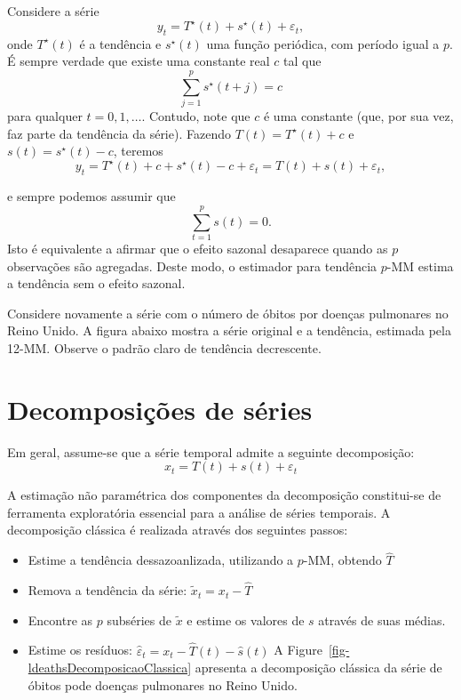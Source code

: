 \documentclass[
  letterpaper,
  DIV=11,
  numbers=noendperiod]{scrartcl}
\theoremstyle{definition}
\theoremstyle{definition}
\theoremstyle{plain}
\theoremstyle{plain}
\theoremstyle{remark}
\begin{document}
Considere a série \[y_t = T^\star(t)+s^\star(t)+\varepsilon_t,\] onde
\(T^\star(t)\) é a tendência e \(s^\star(t)\) uma função periódica, com
período igual a \(p\). É sempre verdade que existe uma constante real
\(c\) tal que \[\sum_{j=1}^p s^\star(t+j)=c\] para qualquer
\(t=0,1,\ldots\). Contudo, note que \(c\) é uma constante (que, por sua
vez, faz parte da tendência da série). Fazendo \(T(t)=T^\star(t)+c\) e
\(s(t)=s^\star(t)-c\), teremos
\[y_t = T^\star(t)+c + s^\star(t)-c+\varepsilon_t=T(t)+ s(t)+\varepsilon_t,\]

e sempre podemos assumir que \[\sum_{t=1}^{p}s(t)=0.\] Isto é
equivalente a afirmar que o efeito sazonal desaparece quando as \(p\)
observações são agregadas. Deste modo, o estimador para tendência
\(p\)-MM estima a tendência sem o efeito sazonal.

Considere novamente a série com o número de óbitos por doenças
pulmonares no Reino Unido. A figura abaixo mostra a série original e a
tendência, estimada pela 12-MM. Observe o padrão claro de tendência
decrescente.

\begin{figure}\end{figure}%

\section{Decomposições de
séries}\label{decomposiuxe7uxf5es-de-suxe9ries}

Em geral, assume-se que a série temporal admite a seguinte decomposição:
\[x_t=T(t)+s(t)+\varepsilon_t\]

A estimação não paramétrica dos componentes da decomposição constitui-se
de ferramenta exploratória essencial para a análise de séries temporais.
A decomposição clássica é realizada através dos seguintes passos:

\begin{itemize}
\item
  Estime a tendência dessazoanlizada, utilizando a \(p\)-MM, obtendo
  \(\hat{T}\)
\item
  Remova a tendência da série: \(\tilde{x}_t=x_t-\hat{T}\)
\item
  Encontre as \(p\) subséries de \(\tilde{x}\) e estime os valores de
  \(s\) através de suas médias.
\item
  Estime os resíduos: \(\hat{\varepsilon}_t=x_t-\hat{T}(t)-\hat{s}(t)\)
  A Figure~\ref{fig-ldeathsDecomposicaoClassica} apresenta a
  decomposição clássica da série de óbitos pode doenças pulmonares no
  Reino Unido.
\end{itemize}
\end{document}

